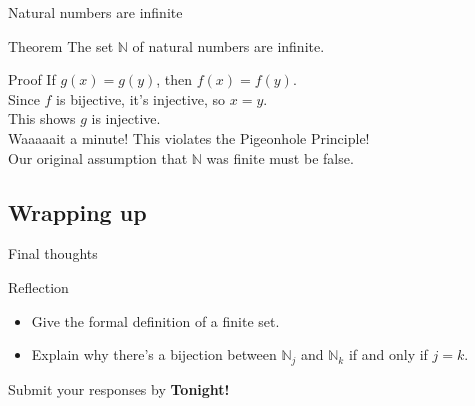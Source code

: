 \documentclass{beamer}
\begin{document}
\begin{frame}{Natural numbers are infinite}
\pause
\begin{block}{Theorem}
The set $\mathbb N$ of natural numbers are infinite.
\end{block}
\pause
\begin{block}{Proof}
\pause
If $g(x) = g(y)$, then $f(x) = f(y)$.\\
\pause
Since $f$ is bijective, it's injective, so $x=y$.\\
\pause
This shows $g$ is injective.\\
\pause
Waaaaait a minute!  This violates the Pigeonhole Principle!\\
\pause
Our original assumption that $\mathbb N$ was finite must be false.
\end{block}
\end{frame}


\subsection{Wrapping up}

\begin{frame}{Final thoughts}
  \begin{block}{Reflection}
    \begin{itemize}
\pause
      \item  Give the formal definition of a finite set.
      \item  Explain why there's a bijection between $\mathbb N_j$ and $\mathbb N_k$ if and only if $j=k$.
    \end{itemize}
  \end{block}
\begin{center}
Submit your responses by \textbf{Tonight!}
\end{center}
\end{frame}
\end{document}

